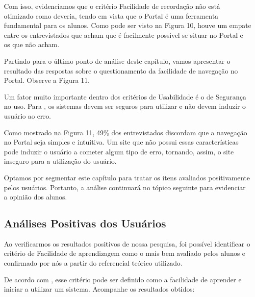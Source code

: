 \documentclass[12pt]{article}
\begin{document}
Com isso, evidenciamos que o critério Facilidade de recordação não está otimizado como deveria, tendo em vista que o Portal é uma ferramenta fundamental para os alunos. Como pode ser visto na Figura 10, houve um empate entre os entrevistados que acham que é facilmente possível se situar no Portal e os que não acham.

Partindo para o último ponto de análise deste capítulo, vamos apresentar o resultado das respostas sobre o questionamento da facilidade de navegação no Portal. Observe a Figura 11.

Um fator muito importante dentro dos critérios de Usabilidade é o de Segurança no uso. Para , os sistemas devem ser seguros para utilizar e não devem induzir o usuário ao erro.  

Como mostrado na Figura 11, 49\% dos entrevistados discordam que a navegação no Portal seja simples e intuitiva. Um site que não possui essas características pode induzir o usuário a cometer algum tipo de erro, tornando, assim, o site inseguro para a utilização do usuário.

Optamos por segmentar este capítulo para tratar os itens avaliados positivamente pelos usuários. Portanto, a análise continuará no tópico seguinte para evidenciar a opinião dos alunos.

\subsection{Análises Positivas dos Usuários}
Ao verificarmos os resultados positivos de nossa pesquisa, foi possível identificar o critério de Facilidade de aprendizagem como o mais bem avaliado pelos alunos e confirmado por nós a partir do referencial teórico utilizado. 

De acordo com , esse critério pode ser definido como a facilidade de aprender e iniciar a utilizar um sistema. Acompanhe os resultados obtidos:
\end{document}
